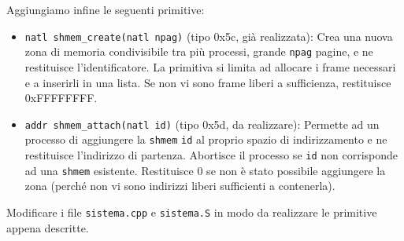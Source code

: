 Aggiungiamo infine le seguenti primitive:
\begin{itemize}
   \item \verb|natl shmem_create(natl npag)| (tipo 0x5c, gi\`a realizzata):
   	Crea una nuova zona di memoria condivisibile tra pi\`u processi, grande \verb|npag| pagine,
	e ne restituisce l'identificatore.
	La primitiva si limita ad allocare i frame necessari e a inserirli in una lista.
	Se non vi sono frame liberi a sufficienza, restituisce 0xFFFFFFFF.
   \item \verb|addr shmem_attach(natl id)| (tipo 0x5d, da realizzare):
   	Permette ad un processo di aggiungere la \verb|shmem| \verb|id| al proprio spazio di indirizzamento
	e ne restituisce l'indirizzo di partenza.
	Abortisce il processo se \verb|id| non corrisponde ad una \verb|shmem| esistente.
	Restituisce 0 se non \`e stato possibile aggiungere la zona (perch\'e non vi sono
	indirizzi liberi sufficienti a contenerla).
\end{itemize}

Modificare i file \verb|sistema.cpp| e \verb|sistema.S| in modo da realizzare le primitive appena descritte.

